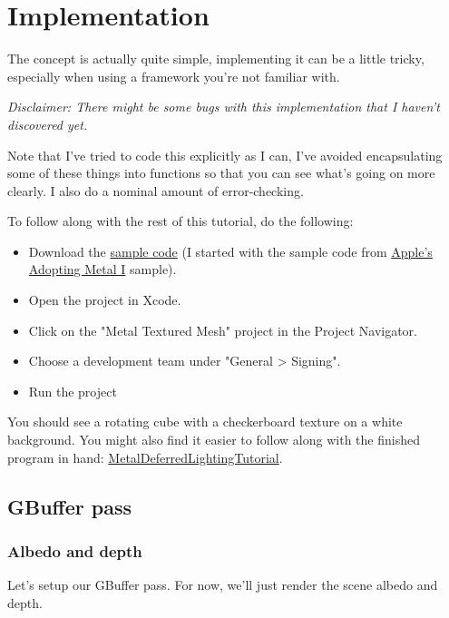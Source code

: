 \documentclass[11pt]{article}
\begin{document}
\section*{Implementation}
\label{sec:orgc1997fc}

The concept is actually quite simple, implementing it can be a little tricky,
especially when using a framework you're not familiar with.

\emph{Disclaimer: There might be some bugs with this implementation that I haven't
discovered yet.}

Note that I've tried to code this explicitly as I can, I've avoided
encapsulating some of these things into functions so that you can see what's
going on more clearly. I also do a nominal amount of error-checking.

To follow along with the rest of this tutorial, do the following:
\begin{itemize}
\item Download the \href{https://developer.apple.com/library/content/samplecode/AdoptingMetalI/AdoptingMetalIApracticalapproachtoyourfirstMetalapp.zip}{sample code} (I started with the sample code from \href{https://developer.apple.com/library/content/samplecode/AdoptingMetalI/Introduction/Intro.html}{Apple's Adopting Metal I} sample).
\item Open the project in Xcode.
\item Click on the "Metal Textured Mesh" project in the Project Navigator.
\item Choose a development team under "General > Signing".
\item Run the project
\end{itemize}

You should see a rotating cube with a checkerboard texture on a white
background. You might also find it easier to follow along with the finished
program in hand: \href{https://github.com/sevanspowell/MetalDeferredLightingTutorial}{MetalDeferredLightingTutorial}.

\subsection*{GBuffer pass}
\label{sec:org2f867fd}

\subsubsection*{Albedo and depth}
\label{sec:org480398e}

Let's setup our GBuffer pass. For now, we'll just render the scene albedo and depth.
\end{document}
